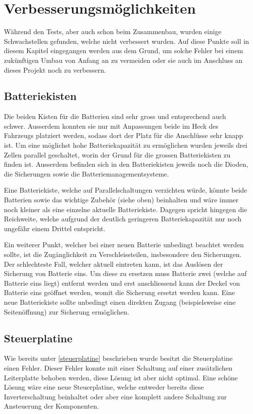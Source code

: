 \section{Verbesserungsmöglichkeiten}
\color{blue}
Während den Tests, aber auch schon beim Zusammenbau, wurden einige Schwachstellen gefunden, welche nicht verbessert wurden. Auf diese Punkte soll in diesem Kapitel eingegangen werden aus dem Grund, um solche Fehler bei einem zukünftigen Umbau von Anfang an zu vermeiden oder sie auch im Anschluss an dieses Projekt noch zu verbessern. 

\subsection{Batteriekisten}
Die beiden Kisten für die Batterien sind sehr gross und entsprechend auch schwer. Ausserdem konnten sie nur mit Anpassungen beide im Heck des Fahrzeugs platziert werden, sodass dort der Platz für die Anschlüsse sehr knapp ist. Um eine möglichst hohe Batteriekapazität zu ermöglichen wurden jeweils drei Zellen parallel geschaltet, worin der Grund für die grossen Batteriekisten zu finden ist. Ausserdem befinden sich in den Batteriekisten jeweils noch die Dioden, die Sicherungen sowie die Batteriemanagementsysteme.

Eine Batteriekiste, welche auf Parallelschaltungen verzichten würde, könnte beide Batterien sowie das wichtige Zubehör (siehe oben) beinhalten und wäre immer noch kleiner als eine einzelne aktuelle Batteriekiste. Dagegen spricht hingegen die Reichweite, welche aufgrund der deutlich geringeren Batteriekapazität nur noch ungefähr einem Drittel entspricht.

Ein weiterer Punkt, welcher bei einer neuen Batterie unbedingt beachtet werden sollte, ist die Zugänglichkeit zu Verschleissteilen, insbesondere den Sicherungen. Der schlechteste Fall, welcher aktuell eintreten kann, ist das Auslösen der Sicherung von Batterie eins. Um diese zu ersetzen muss Batterie zwei (welche auf Batterie eins liegt) entfernt werden und erst anschliessend kann der Deckel von Batterie eins geöffnet werden, womit die Sicherung ersetzt werden kann. Eine neue Batteriekiste sollte unbedingt einen direkten Zugang (beispielsweise eine Seitenöffnung) zur Sicherung ermöglichen.

\subsection{Steuerplatine}
Wie bereits unter \ref{steuerplatine} beschrieben wurde besitzt die Steuerplatine einen Fehler. Dieser Fehler konnte mit einer Schaltung auf einer zusätzlichen Leiterplatte behoben werden, diese Lösung ist aber nicht optimal. Eine schöne Lösung wäre eine neue Steuerplatine, welche entweder bereits diese Inverterschaltung beinhaltet oder aber eine komplett andere Schaltung zur Ansteuerung der Komponenten.

